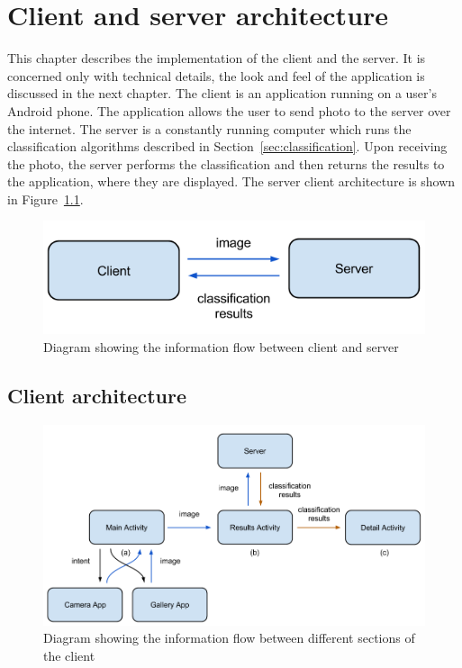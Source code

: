 \documentclass[11pt, a4paper]{report}
\begin{document}
\chapter{Client and server architecture}
\label{sec:client_server}

This chapter describes the implementation of the client and the server. It is concerned only with technical details, the look and feel of the application is discussed in the next chapter. The client is an application running on a user's Android phone. The application allows the user to send photo to the server over the internet. The server is a constantly running computer which runs the classification algorithms described in Section~\ref{sec:classification}. Upon receiving the photo, the server performs the classification and then returns the results to the application, where they are displayed. The server client architecture is shown in Figure~\ref{img:11}.


\begin{figure}[h]
	\centering
  \includegraphics[totalheight=3cm]{img/11.png}
  \caption{Diagram showing the information flow between client and server}
  \label{img:11}
\end{figure}


\section{Client architecture} 

\begin{figure}[h]
	\centering
  \includegraphics[totalheight=9cm]{img/12.png}
  \caption{Diagram showing the information flow between different sections of the client}
  \label{img:12}
\end{figure}
\end{document}

